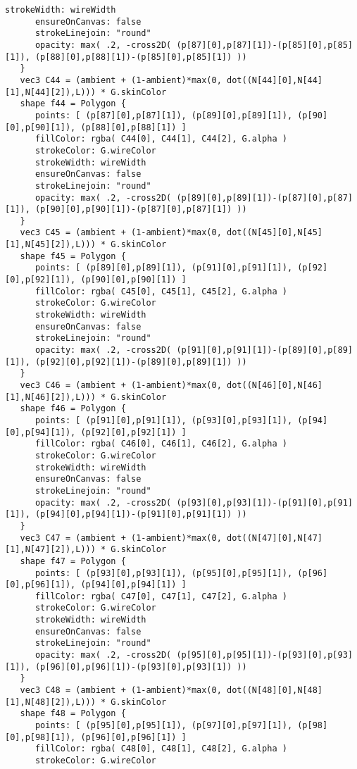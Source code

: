 \begin{lstlisting}[language=Sty-RT,escapechar=@]
      strokeWidth: wireWidth
      ensureOnCanvas: false
      strokeLinejoin: "round"
      opacity: max( .2, -cross2D( (p[87][0],p[87][1])-(p[85][0],p[85][1]), (p[88][0],p[88][1])-(p[85][0],p[85][1]) ))
   }
   vec3 C44 = (ambient + (1-ambient)*max(0, dot((N[44][0],N[44][1],N[44][2]),L))) * G.skinColor
   shape f44 = Polygon {
      points: [ (p[87][0],p[87][1]), (p[89][0],p[89][1]), (p[90][0],p[90][1]), (p[88][0],p[88][1]) ]
      fillColor: rgba( C44[0], C44[1], C44[2], G.alpha )
      strokeColor: G.wireColor
      strokeWidth: wireWidth
      ensureOnCanvas: false
      strokeLinejoin: "round"
      opacity: max( .2, -cross2D( (p[89][0],p[89][1])-(p[87][0],p[87][1]), (p[90][0],p[90][1])-(p[87][0],p[87][1]) ))
   }
   vec3 C45 = (ambient + (1-ambient)*max(0, dot((N[45][0],N[45][1],N[45][2]),L))) * G.skinColor
   shape f45 = Polygon {
      points: [ (p[89][0],p[89][1]), (p[91][0],p[91][1]), (p[92][0],p[92][1]), (p[90][0],p[90][1]) ]
      fillColor: rgba( C45[0], C45[1], C45[2], G.alpha )
      strokeColor: G.wireColor
      strokeWidth: wireWidth
      ensureOnCanvas: false
      strokeLinejoin: "round"
      opacity: max( .2, -cross2D( (p[91][0],p[91][1])-(p[89][0],p[89][1]), (p[92][0],p[92][1])-(p[89][0],p[89][1]) ))
   }
   vec3 C46 = (ambient + (1-ambient)*max(0, dot((N[46][0],N[46][1],N[46][2]),L))) * G.skinColor
   shape f46 = Polygon {
      points: [ (p[91][0],p[91][1]), (p[93][0],p[93][1]), (p[94][0],p[94][1]), (p[92][0],p[92][1]) ]
      fillColor: rgba( C46[0], C46[1], C46[2], G.alpha )
      strokeColor: G.wireColor
      strokeWidth: wireWidth
      ensureOnCanvas: false
      strokeLinejoin: "round"
      opacity: max( .2, -cross2D( (p[93][0],p[93][1])-(p[91][0],p[91][1]), (p[94][0],p[94][1])-(p[91][0],p[91][1]) ))
   }
   vec3 C47 = (ambient + (1-ambient)*max(0, dot((N[47][0],N[47][1],N[47][2]),L))) * G.skinColor
   shape f47 = Polygon {
      points: [ (p[93][0],p[93][1]), (p[95][0],p[95][1]), (p[96][0],p[96][1]), (p[94][0],p[94][1]) ]
      fillColor: rgba( C47[0], C47[1], C47[2], G.alpha )
      strokeColor: G.wireColor
      strokeWidth: wireWidth
      ensureOnCanvas: false
      strokeLinejoin: "round"
      opacity: max( .2, -cross2D( (p[95][0],p[95][1])-(p[93][0],p[93][1]), (p[96][0],p[96][1])-(p[93][0],p[93][1]) ))
   }
   vec3 C48 = (ambient + (1-ambient)*max(0, dot((N[48][0],N[48][1],N[48][2]),L))) * G.skinColor
   shape f48 = Polygon {
      points: [ (p[95][0],p[95][1]), (p[97][0],p[97][1]), (p[98][0],p[98][1]), (p[96][0],p[96][1]) ]
      fillColor: rgba( C48[0], C48[1], C48[2], G.alpha )
      strokeColor: G.wireColor

\end{lstlisting}
